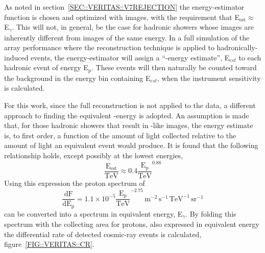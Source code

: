 As noted in section~\ref{SEC::VERITAS::V7REJECTION} the
energy-estimator function is chosen and optimized with \Gray images,
with the requirement that
\mbox{E$_\mathrm{est}\approx$\,E$_\gamma$}. This will not, in general,
be the case for hadronic showers whose images are inherently different
from \Gray images of the same energy. In a full simulation of the
array performance where the reconstruction technique is applied to
hadronically-induced events, the energy-estimator will assign a
``\Grayc-energy estimate'', E$_{est}$ to each hadronic event of energy
E$_\mathrm{p}$. These events will then naturally be counted toward the
background in the energy bin containing E$_{est}$, when the instrument
sensitivity is calculated.

For this work, since the full reconstruction is not applied to the
data, a different approach to finding the equivalent \Grayc-energy is
adopted. An assumption is made that, for those hadronic showers that
result in \Grayc-like images, the energy estimate is, to first order,
a function of the amount of light collected relative to the amount of
light an equivalent \Gray event would produce. It is found that the
following relationship holds, except possibly at the lowest energies,
\[ \mathrm{\frac{E_{est}}{TeV} \approx 0.4 \frac{E_p}{TeV}^{0.88}} \]
Using this expression the proton spectrum of 
\[\mathrm{\frac{dF}{dE_p}=1.1\times10^{-5}
\frac{E_p}{TeV}^{-2.75}\,m^{-2}\,s^{-1}\,TeV^{-1}\,sr^{-1}}\] 
can be converted into a spectrum in equivalent \Gray energy,
E$_\gamma$.  By folding this spectrum with the collecting area for
protons, also expressed in equivalent \Gray energy the differential
rate of detected cosmic-ray events is calculated,
figure~\ref{FIG::VERITAS::CR}.

